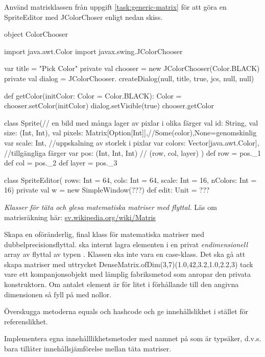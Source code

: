 \Task Använd matrisklassen från uppgift \ref{task:generic-matrix} för att göra en SpriteEditor med JColorChoser enligt nedan skiss.

\begin{Code}
object ColorChooser {
  import java.awt.Color
  import javax.swing.JColorChooser

  var title = "Pick Color"
  private val chooser = new JColorChooser(Color.BLACK)
  private val dialog = JColorChooser.
    createDialog(null, title, true, jcs, null, null)

  def getColor(initColor: Color = Color.BLACK): Color = {
    chooser.setColor(initColor)
    dialog.setVisible(true)
    chooser.getColor
  }
}

class Sprite(// en bild med många lager av pixlar i olika färger
  val id: String,
  val size: (Int, Int),
  val pixels: Matrix[Option[Int]],//Some(color),None=genomskinlig
  var scale: Int, //uppskalning av storlek i pixlar
  var colors: Vector[java.awt.Color], //tillgängliga färger
  var pos: (Int, Int, Int)  // (row, col, layer)
){
  def row = pos._1
  def col = pos._2
  def layer = pos._3
}

class SpriteEditor(
    rows: Int = 64, cols: Int = 64,
    scale: Int = 16, nColors: Int = 16) {
  private val w = new SimpleWindow(???)
  def edit: Unit = ???
}

\end{Code}



\Task \emph{Klasser för täta och glesa matematiska matriser med flyttal.}  Läs om matrisräkning här: \href{https://sv.wikipedia.org/wiki/Matris}{sv.wikipedia.org/wiki/Matris}

\Subtask Skapa en oföränderlig, final klass  för matematiska matriser med dubbelprecisionsflyttal.  ska internt lagra elementen i en privat \emph{endimensionell} array av flyttal av typen . Klassen ska inte vara en case-klass. Det ska gå att skapa matriser med uttrycket DenseMatrix.ofDim(3,7)(1.0,42,3.2,1.0,2.2,3) tack vare ett kompanjonsobjekt med lämplig fabriksmetod som anropar den privata konstruktorn.  Om antalet element är för litet i förhållande till den angivna dimensionen så fyll på med nollor.

\Subtask Överskugga metoderna equals och hashcode och ge  innehållslikhet i stället för referenslikhet.

\Subtask Implementera egna innehålllikhetsmetoder med namnet \code{===} på  som är typsäker, d.v.s. bara tillåter innehållsjämförelse mellan täta matriser.

